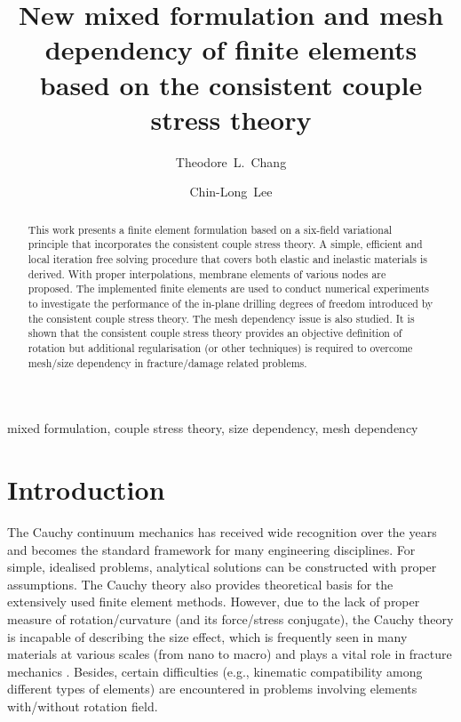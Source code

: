 \documentclass[3p,sort&compress,11pt,fleqn]{elsarticle}
\begin{document}
\begin{abstract}
This work presents a finite element formulation based on a six-field variational principle that incorporates the consistent couple stress theory. A simple, efficient and local iteration free solving procedure that covers both elastic and inelastic materials is derived. With proper interpolations, membrane elements of various nodes are proposed. The implemented finite elements are used to conduct numerical experiments to investigate the performance of the in-plane drilling degrees of freedom introduced by the consistent couple stress theory. The mesh dependency issue is also studied. It is shown that the consistent couple stress theory provides an objective definition of rotation but additional regularisation (or other techniques) is required to overcome mesh/size dependency in fracture/damage related problems.
\end{abstract}
\begin{keyword}
mixed formulation\sep
couple stress theory\sep
size dependency\sep
mesh dependency
\end{keyword}
\begin{frontmatter}
\title{New mixed formulation and mesh dependency of finite elements based on the consistent couple stress theory}
\author[]{Theodore~L.~Chang}
\author[]{Chin-Long~Lee}
\address{Department of Civil and Natural Resources Engineering, University of Canterbury, Christchurch, New Zealand, 8041.}
\end{frontmatter}
\section{Introduction}
The Cauchy continuum mechanics has received wide recognition over the years and becomes the standard framework for many engineering disciplines. For simple, idealised problems, analytical solutions can be constructed \citep[see, e.g.,][]{Timoshenko2010} with proper assumptions. The Cauchy theory also provides theoretical basis for the extensively used finite element methods. However, due to the lack of proper measure of rotation/curvature (and its force/stress conjugate), the Cauchy theory is incapable of describing the size effect, which is frequently seen in many materials at various scales (from nano to macro) and plays a vital role in fracture mechanics \citep{Bazant1984}. Besides, certain difficulties (e.g., kinematic compatibility among different types of elements) are encountered in problems involving elements with/without rotation field.
\end{document}
